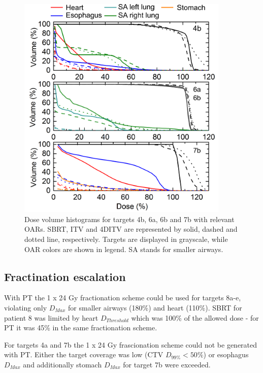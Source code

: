 \documentclass[type=dr, dr=rernat, accentcolor=tud7b,colorbacktitle, bigchapter, openright, twoside, 12pt ]{tudthesis}
\begin{document}
\newpage
\begin{figure}[H]
	\begin{center}
		\includegraphics[width=0.9\textwidth]{./Images/DVH_legend.png}
		\caption{Dose volume histograms for targets 4b, 6a, 6b and 7b with relevant OARs. SBRT, ITV and 4DITV are represented by solid, dashed and dotted line, respectively. Targets are displayed
		in grayscale, while OAR colors are shown in legend. SA stands for smaller airways.}
		\label{Fig:dvh}
	\end{center}
\end{figure}
\newpage


\subsection{Fractination escalation}

With PT the 1 x 24 Gy fractionation scheme could be used for targets 8a-e, violating only $D_{Max}$ for smaller airways (180\%) and heart (110\%). 
SBRT for patient 8 was limited by heart $D_{Threshold}$ which was 100\% of the allowed dose - for PT it was 45\% in the same fractionation scheme.

For targets 4a and 7b the 1 x 24 Gy frascionation scheme could not be generated with PT. Either the target coverage was low (CTV $D_{99\%} < 50\%$) or 
esophagus $D_{Max}$ and additionally stomach $D_{Max}$ for target 7b were exceeded.
\end{document}
